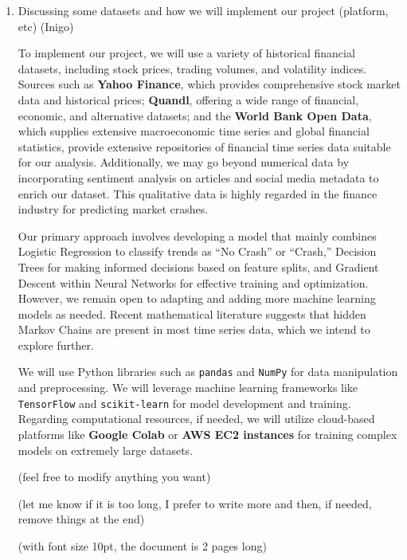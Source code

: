 \documentclass[10pt, letterpaper]{article}
\begin{document}
\begin{enumerate}
        
    \item Discussing some datasets and how we will implement our project (platform, etc) (Inigo)

    To implement our project, we will use a variety of historical financial datasets, including stock prices, trading volumes, and volatility indices. Sources such as \textbf{Yahoo Finance}, which provides comprehensive stock market data and historical prices; \textbf{Quandl}, offering a wide range of financial, economic, and alternative datasets; and the \textbf{World Bank Open Data}, which supplies extensive macroeconomic time series and global financial statistics, provide extensive repositories of financial time series data suitable for our analysis. Additionally, we may go beyond numerical data by incorporating sentiment analysis on articles and social media metadata to enrich our dataset. This qualitative data is highly regarded in the finance industry for predicting market crashes.

Our primary approach involves developing a model that mainly combines Logistic Regression to classify trends as ``No Crash'' or ``Crash,'' Decision Trees for making informed decisions based on feature splits, and Gradient Descent within Neural Networks for effective training and optimization. However, we remain open to adapting and adding more machine learning models as needed. Recent mathematical literature suggests that hidden Markov Chains are present in most time series data, which we intend to explore further.

We will use Python libraries such as \texttt{pandas} and \texttt{NumPy} for data manipulation and preprocessing. We will leverage machine learning frameworks like \texttt{TensorFlow} and \texttt{scikit-learn} for model development and training. Regarding computational resources, if needed, we will utilize cloud-based platforms like \textbf{Google Colab} or \textbf{AWS EC2 instances} for training complex models on extremely large datasets. 

(feel free to modify anything you want)

(let me know if it is too long, I prefer to write more and then, if needed, remove things at the end)

(with font size 10pt, the document is 2 pages long)
    





    
\end{enumerate}
\end{document}

